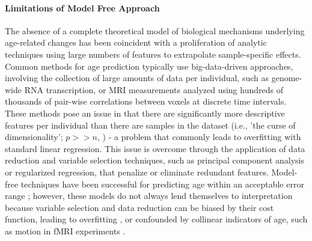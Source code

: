 \documentclass[utf8]{stylesheet}
\begin{document}
\paragraph{Limitations of Model Free Approach} 
The absence of a complete theoretical model of biological mechanisms underlying age-related changes has been coincident with a proliferation of analytic techniques using large numbers of features to extrapolate sample-specific effects. Common methods for age prediction typically use big-data-driven approaches, involving the collection of large amounts of data per individual, such as genome-wide RNA transcription, or MRI measurements analyzed using hundreds of thousands of pair-wise correlations between voxels at discrete time intervals. These methods pose an issue in that there are significantly more descriptive features per individual than there are samples in the dataset (i.e., 'the curse of dimensionality'; $p >> n$, \cite{taylor2019}) - a problem that commonly leads to overfitting with standard linear regression. This issue is overcome through the application of data reduction and variable selection techniques, such as principal component analysis or regularized regression, that penalize or eliminate redundant features. Model-free techniques have been successful for predicting age within an acceptable error range \citep{cole2017predicting}; however, these models do not always lend themselves to interpretation because variable selection and data reduction can be biased by their cost function, leading to overfitting \citep{babyak2004you}, or confounded by collinear indicators of age, such as motion in fMRI experiments \citep{satterthwaite2013heterogeneous}.
%
\vspace{5pt}
%
\end{document}
